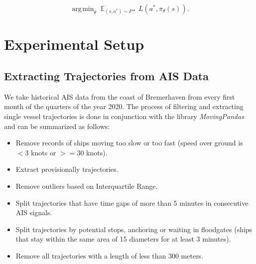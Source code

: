 \documentclass[conference]{IEEEtran}
\DeclareMathOperator{\argmin}{\arg\!\min}
\DeclareMathOperator{\E}{\mathbb{E}}
\begin{document}
\begin{equation}
\argmin_\theta \E_{(s,a^*) \sim P*} L(a^*, \pi_\theta(s)).
\end{equation}

\section{Experimental Setup}
\subsection{Extracting Trajectories from AIS Data}
We take historical AIS data from the coast of Bremerhaven from every first month of the quarters of the year 2020. The process of filtering and extracting single vessel trajectories is done in conjunction with the library \textit{MovingPandas}\cite{graser2019movingpandas} and can be summarized as follows:

\begin{itemize}
    \item Remove records of ships moving too slow or too fast (speed over ground is $<3$ knots or $>=30$ knots).
    \item Extract provisionally trajectories.
    \item Remove outliers based on Interquartile Range.
    \item Split trajectories that have time gaps of more than 5 minutes in consecutive AIS signals.
    \item Split trajectories by potential stops, anchoring or waiting in floodgates (ships that stay within the same area of 15 diameters for at least 3 minutes).
    \item Remove all trajectories with a length of less than 300 meters.
\end{itemize}
\end{document}
